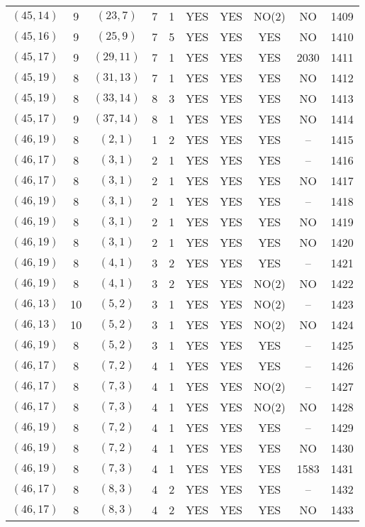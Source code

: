 \begin{longtable}{|c|c|c|c|c|c|c|c|c|c|}
$(45, 14)$ & 9 & $(23, 7)$ & 7 & 1 & YES & YES & NO(2) & NO & 1409\\
$(45, 16)$ & 9 & $(25, 9)$ & 7 & 5 & YES & YES & YES & NO & 1410\\
$(45, 17)$ & 9 & $(29, 11)$ & 7 & 1 & YES & YES & YES & 2030 & 1411\\
$(45, 19)$ & 8 & $(31, 13)$ & 7 & 1 & YES & YES & YES & NO & 1412\\
$(45, 19)$ & 8 & $(33, 14)$ & 8 & 3 & YES & YES & YES & NO & 1413\\
$(45, 17)$ & 9 & $(37, 14)$ & 8 & 1 & YES & YES & YES & NO & 1414\\
$(46, 19)$ & 8 & $(2, 1)$ & 1 & 2 & YES & YES & YES & -- & 1415\\
$(46, 17)$ & 8 & $(3, 1)$ & 2 & 1 & YES & YES & YES & -- & 1416\\
$(46, 17)$ & 8 & $(3, 1)$ & 2 & 1 & YES & YES & YES & NO & 1417\\
$(46, 19)$ & 8 & $(3, 1)$ & 2 & 1 & YES & YES & YES & -- & 1418\\
$(46, 19)$ & 8 & $(3, 1)$ & 2 & 1 & YES & YES & YES & NO & 1419\\
$(46, 19)$ & 8 & $(3, 1)$ & 2 & 1 & YES & YES & YES & NO & 1420\\
$(46, 19)$ & 8 & $(4, 1)$ & 3 & 2 & YES & YES & YES & -- & 1421\\
$(46, 19)$ & 8 & $(4, 1)$ & 3 & 2 & YES & YES & NO(2) & NO & 1422\\
$(46, 13)$ & 10 & $(5, 2)$ & 3 & 1 & YES & YES & NO(2) & -- & 1423\\
$(46, 13)$ & 10 & $(5, 2)$ & 3 & 1 & YES & YES & NO(2) & NO & 1424\\
$(46, 19)$ & 8 & $(5, 2)$ & 3 & 1 & YES & YES & YES & -- & 1425\\
$(46, 17)$ & 8 & $(7, 2)$ & 4 & 1 & YES & YES & YES & -- & 1426\\
$(46, 17)$ & 8 & $(7, 3)$ & 4 & 1 & YES & YES & NO(2) & -- & 1427\\
$(46, 17)$ & 8 & $(7, 3)$ & 4 & 1 & YES & YES & NO(2) & NO & 1428\\
$(46, 19)$ & 8 & $(7, 2)$ & 4 & 1 & YES & YES & YES & -- & 1429\\
$(46, 19)$ & 8 & $(7, 2)$ & 4 & 1 & YES & YES & YES & NO & 1430\\
$(46, 19)$ & 8 & $(7, 3)$ & 4 & 1 & YES & YES & YES & 1583 & 1431\\
$(46, 17)$ & 8 & $(8, 3)$ & 4 & 2 & YES & YES & YES & -- & 1432\\
$(46, 17)$ & 8 & $(8, 3)$ & 4 & 2 & YES & YES & YES & NO & 1433\\

\end{longtable}
